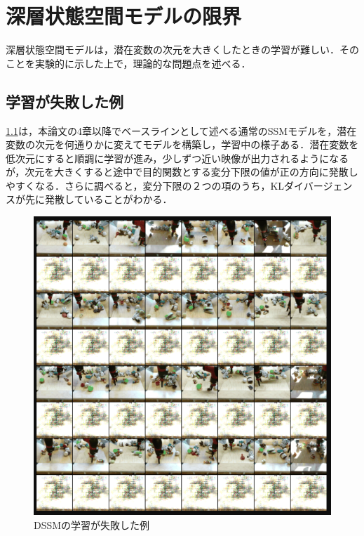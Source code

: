 \chapter{深層状態空間モデルの限界}
\label{chap:baseline}


深層状態空間モデルは，潜在変数の次元を大きくしたときの学習が難しい．そのことを実験的に示した上で，理論的な問題点を述べる．

\section{学習が失敗した例}
\ref{fig:dssm_failure}は，本論文の4章以降でベースラインとして述べる通常のSSMモデルを，潜在変数の次元を何通りかに変えてモデルを構築し，学習中の様子ある．潜在変数を低次元にすると順調に学習が進み，少しずつ近い映像が出力されるようになるが，次元を大きくすると途中で目的関数とする変分下限の値が正の方向に発散しやすくなる．さらに調べると，変分下限の２つの項のうち，KLダイバージェンスが先に発散していることがわかる．

\begin{figure}[tbp]
    \begin{center}
      \includegraphics[width=\linewidth]{./figures/dssm_failure.png}
      \caption{DSSMの学習が失敗した例}
      \label{fig:dssm_failure}
    \end{center}
  \end{figure}

